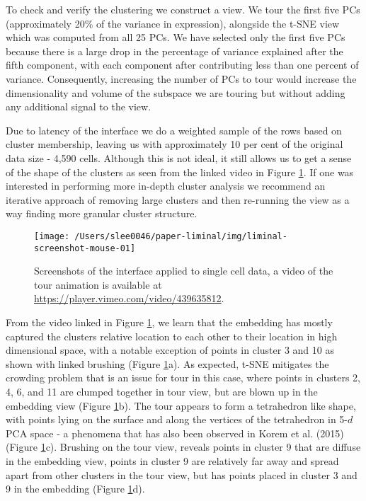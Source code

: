 \documentclass[article,notitle]{jdssv}
\begin{document}
To check and verify the clustering we construct a  view.
We tour the first five PCs (approximately 20\% of the variance in expression),
alongside the t-SNE view which was computed from all 25 PCs. We have selected only the first five PCs because there is a large drop in the percentage of variance explained after the fifth component, with each component after contributing less than one percent of variance.
Consequently, increasing the number of PCs to tour would increase the dimensionality and volume of the subspace we are touring but without adding any additional signal to the view.

Due to latency of the  interface we do a weighted sample of the rows based on
cluster membership, leaving us with approximately 10 per cent of the original
data size - 4,590 cells. Although this is not ideal, it still allows us to
get a sense of the shape of the clusters as seen from the linked video in Figure \ref{fig:mouse-01}. If one was interested in performing more in-depth cluster analysis we recommend an iterative approach of removing large clusters and then re-running the  view as a way finding more granular cluster structure.



\begin{figure}

{\centering \texttt{[image: /Users/slee0046/paper-liminal/img/liminal-screenshot-mouse-01]} 

}

\caption{Screenshots of the  interface applied to single cell data, a video of the tour animation is available at \url{https://player.vimeo.com/video/439635812}.}\label{fig:mouse-01}
\end{figure}

From the video linked in Figure \ref{fig:mouse-01}, we learn that the embedding has mostly captured the
clusters relative location to each other to their location in high dimensional space, with a notable exception of points in cluster 3 and 10 as shown with
linked brushing (Figure \ref{fig:mouse-01}a). As expected, t-SNE mitigates the crowding problem that is
an issue for tour in this case, where points in clusters 2, 4, 6, and 11 are
clumped together in tour view, but are blown up in the embedding view (Figure \ref{fig:mouse-01}b).
The tour appears to form a tetrahedron like shape, with points lying on
the surface and along the vertices of the tetrahedron in 5-\(d\) PCA space -
a phenomena that has also been observed in Korem et al. (2015)
(Figure \ref{fig:mouse-01}c). Brushing on
the tour view, reveals points in cluster 9 that are diffuse in the embedding
view, points in cluster 9 are relatively far away and spread apart from other
clusters in the tour view, but has points placed in cluster 3 and 9 in the embedding
(Figure \ref{fig:mouse-01}d).
\end{document}
